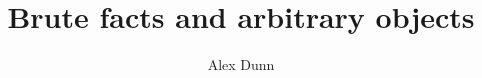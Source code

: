 \documentclass[11pt]{article}
\title{Brute facts and arbitrary objects}
\author{Alex Dunn}
\begin{document}
\ifstandalone
\maketitle
\begin{spacing}{1.5}
\fi

%
%
%

\end{spacing}
\end{document}
